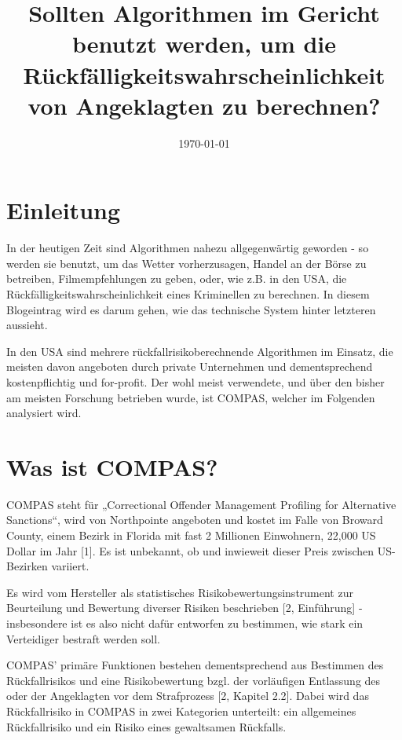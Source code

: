 \documentclass[10pt, a4paper, twocolumn]{article} %
\title{Sollten Algorithmen im Gericht benutzt werden, um die Rückfälligkeitswahrscheinlichkeit von Angeklagten zu berechnen? } %
\author{
	\authorstyle{Gruppe: 10\\ Journalist: Frank Eric Mbouga \\ Quellenprüfer: Jonas Opitz \\Redakteur: Jonas Opitz} %
}
\date{\today} %
\begin{document}
\maketitle %

\thispagestyle{firstpage} %

\section{Einleitung}

In der heutigen Zeit sind Algorithmen nahezu allgegenwärtig geworden - so werden sie benutzt, um das Wetter vorherzusagen, Handel an der Börse zu betreiben, Filmempfehlungen zu geben, oder, wie z.B. in den USA, die Rückfälligkeitswahrscheinlichkeit eines Kriminellen zu berechnen.
In diesem Blogeintrag wird es darum gehen, wie das technische System hinter letzteren aussieht.

In den USA sind mehrere rückfallrisikoberechnende Algorithmen im Einsatz, die meisten davon angeboten durch private Unternehmen und dementsprechend kostenpflichtig und for-profit. Der wohl meist verwendete, und über den bisher am meisten Forschung betrieben wurde, ist COMPAS, welcher im Folgenden analysiert wird.


\section{Was ist COMPAS?}
COMPAS steht für „Correctional Offender Management Profiling for Alternative Sanctions“, wird von Northpointe angeboten und kostet im Falle von Broward County, einem Bezirk in Florida mit fast 2 Millionen Einwohnern, 22,000 US Dollar im Jahr [1]. Es ist unbekannt, ob und inwieweit dieser Preis zwischen US-Bezirken variiert.

Es wird vom Hersteller als statistisches Risikobewertungsinstrument zur Beurteilung und Bewertung diverser Risiken beschrieben [2, Einführung] - insbesondere ist es also nicht dafür entworfen zu bestimmen, wie stark ein Verteidiger bestraft werden soll.

COMPAS' primäre Funktionen bestehen dementsprechend aus Bestimmen des Rückfallrisikos und eine Risikobewertung bzgl. der vorläufigen Entlassung des oder der Angeklagten vor dem Strafprozess [2, Kapitel 2.2].
Dabei wird das Rückfallrisiko in COMPAS in zwei Kategorien unterteilt: ein allgemeines Rückfallrisiko und ein Risiko eines gewaltsamen Rückfalls. 
\end{document}

